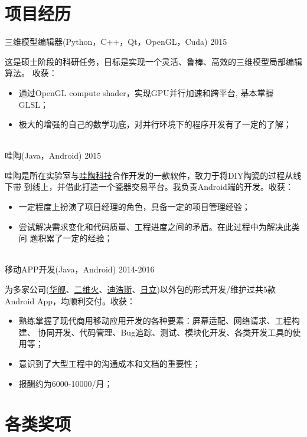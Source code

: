 \documentclass[]{friggeri-cv_cn} %
\begin{document}
\section{项目经历}
\begin{entrylist}

\entry
{三维模型编辑器(Python，C++，Qt，OpenGL，Cuda)}
{2015}
{这是硕士阶段的科研任务，目标是实现一个灵活、鲁棒、高效的三维模型局部编辑算法。
    收获：
\begin{itemize}
    \item 通过OpenGL compute shader，实现GPU并行加速和跨平台, 基本掌握GLSL；
    \item 极大的增强的自己的数学功底，对并行环境下的程序开发有了一定的了解；
\end{itemize}}
\\
\entry
{哇陶(Java，Android)}
{2015}
{哇陶是所在实验室与\href{http://wowtao.me/index.html}{哇陶科技}合作开发的一款软件，致力于将DIY陶瓷的过程从线下带
    到线上，并借此打造一个瓷器交易平台。我负责Android端的开发。收获：
\begin{itemize}
    \item 一定程度上扮演了项目经理的角色，具备一定的项目管理经验；
    \item 尝试解决需求变化和代码质量、工程进度之间的矛盾。在此过程中为解决此类问
        题积累了一定的经验；
\end{itemize}}
\\
\entry
{移动APP开发(Java，Android)}
{2014-2016}
{为多家公司(\href{http://www.hjtechcn.cn/}{华舰}、\href{http://www.2dfire.com/}{二维火}、\href{http://d-controls.com/}{迪浩斯}、\href{http://www.hisensehitachi.com/}{日立})以外包的形式开发/维护过共5款Android App，均顺利交付。收获：
\begin{itemize}
    \item 熟练掌握了现代商用移动应用开发的各种要素：屏幕适配、网络请求、工程构建、
        协同开发、代码管理、Bug追踪、测试、模块化开发、各类开发工具的使用等；
    \item 意识到了大型工程中的沟通成本和文档的重要性；
    \item 报酬约为6000-10000/月；
\end{itemize}}

\end{entrylist}

\section{各类奖项}
\end{document}
